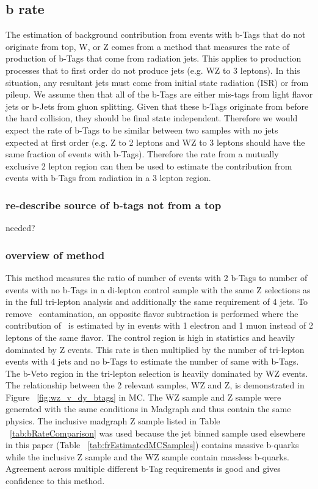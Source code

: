 	\subsection{b rate}
	The estimation of background contribution from events with b-Tags that do not originate from top, W, or Z  comes from a method that measures the rate of production of b-Tags that come from radiation jets. This applies to production processes that to first order do not produce jets (e.g. WZ to 3 leptons). In this situation, any resultant jets must come from initial state radiation (ISR) or from pileup. We assume then that all of the b-Tags are either mis-tags from light flavor jets or b-Jets from gluon splitting. Given that these b-Tags originate from before the hard collision, they should be final state independent. Therefore we would expect the rate of b-Tags to be similar between two samples with no jets expected at first order (e.g. Z to 2 leptons and WZ to 3 leptons should have the same fraction of events with b-Tags). Therefore the rate from a mutually exclusive 2 lepton region can then be used to estimate the contribution from events with b-Tags from radiation in a 3 lepton region.
	
        		\subsubsection{re-describe source of b-tags not from a top}
		needed?
		
        		\subsubsection{overview of method}
		This method measures the ratio of number of events with 2 b-Tags to number of events with no b-Tags in a di-lepton control sample with the same Z selections as in the full tri-lepton analysis and additionally the same requirement of 4 jets. To remove \ttbar \ contamination, an opposite flavor subtraction is performed where the contribution of \ttbar \ is estimated by in events with 1 electron and 1 muon instead of 2 leptons of the same flavor. The control region is high in statistics and heavily dominated by Z events.  This rate is then multiplied by the number of tri-lepton events with 4 jets and no b-Tags to estimate the number of same with b-Tags. The b-Veto region in the tri-lepton selection is heavily dominated by WZ events.\\

The relationship between the 2 relevant samples, WZ and Z, is demonstrated in Figure ~\ref{fig:wz_v_dy_btags} in MC. The WZ sample and Z sample were generated with the same conditions in Madgraph and thus contain the same physics. The inclusive madgraph Z sample listed in Table ~\ref{tab:bRateComparison} was used because the jet binned sample used elsewhere in this paper (Table ~\ref{tab:frEstimatedMCSamples}) contains massive b-quarks while the inclusive Z sample and the WZ sample contain massless b-quarks. Agreement across multiple different b-Tag requirements is good and gives confidence to this method.\\

